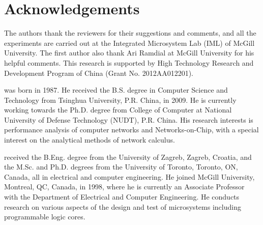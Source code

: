\documentclass[preprint]{elsarticle}
\begin{document}
\section*{Acknowledgements}
The authors thank the reviewers for their suggestions and comments, and all the experiments are carried out at the Integrated Microsystem Lab (IML) of McGill University. The first author also thank Ari Ramdial at McGill University for his helpful comments. This research is supported by High Technology
Research and Development Program of China (Grant No. 2012AA012201).






   was born in 1987. He received the B.S. degree in Computer Science and Technology from Tsinghua University, P.R. China, in 2009. He is currently working towards the Ph.D. degree from College of Computer at National University of Defense Technology (NUDT), P.R. China. His research interests is performance analysis of computer networks and Networks-on-Chip, with a special interest on the analytical methods of network calculus.

\vspace{0.1in}
   received the B.Eng. degree from the University of Zagreb, Zagreb, Croatia, and the M.Sc. and Ph.D. degrees from the University of Toronto, Toronto, ON, Canada, all in electrical and computer engineering. He joined McGill University, Montreal, QC, Canada, in 1998, where he is currently an Associate Professor with the Department of Electrical and Computer Engineering. He conducts research on various aspects of the design and test of microsystems including programmable logic cores.
\end{document}
